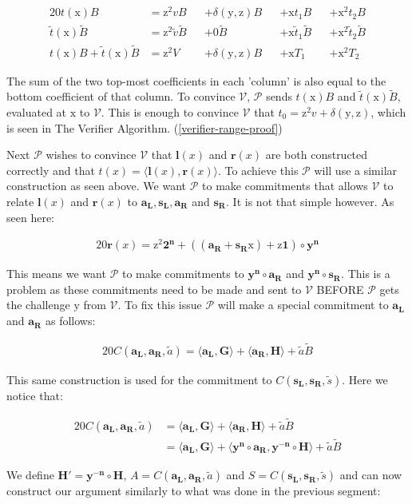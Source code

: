 \documentclass{article}
\newcommand{\eq}[1]{\begin{alignat*}{20}#1\end{alignat*}}
\renewcommand{\vec}[1]{\boldsymbol{#1}}
\newcommand{\ran}[1]{\mathrm{#1}}
\newcommand{\vecran}[1]{\mathbf{#1}}
\newcommand{\V}{\mathcal{V}}
\renewcommand{\P}{\mathcal{P}}
\newcommand{\tB}{\widetilde{B}}
\renewcommand{\tt}{\widetilde{t}}
\newcommand{\tv}{\widetilde{v}}
\newcommand{\dotp}[2]{\langle #1, #2 \rangle}
\newcommand{\opn}[1]{\operatorname{#1}}
\newcommand{\vecl}[1]{\vec{#1_{\opn{L}}}}
\newcommand{\vecr}[1]{\vec{#1_{\opn{R}}}}
\begin{document}
\eq{
	t(\ran{x})B                   &= \ran{z^2}vB      &&+ \delta(\ran{y},\ran{z})B &&+ \ran{x}t_1B       &&+ \ran{x^2}t_2B \\
	\tt(\ran{x})\tB               &= \ran{z^2}\tv \tB &&+ 0\tB                     &&+ \ran{x} \tt_1 \tB &&+ \ran{x^2} \tt_2 \tB\\
	t(\ran{x})B + \tt(\ran{x})\tB &= \ran{z^2}V       &&+ \delta(\ran{y},\ran{z})B &&+ \ran{x}T_1        &&+ \ran{x^2}T_2
}

The sum of the two top-most coefficients in each 'column' is also
equal to the bottom coefficient of that column. To convince $\V$, $\P$
sends $t(\ran{x})B$ and $\tt(\ran{x})\tB$, evaluated at $\ran{x}$
to $\V$. This is enough to convince $\V$ that $t_0 = \ran{z^2}v +
\delta(\ran{y},\ran{z})$, which is seen in The Verifier Algorithm.
(\ref{verifier-range-proof})

Next $\P$ wishes to convince $\V$ that $\vec{l}(x)$ and
$\vec{r}(x)$ are both constructed correctly and that $t(x) =
\dotp{\vec{l}(x)}{\vec{r}(x)}$. To achieve this $\P$ will use a similar
construction as seen above. We want $\P$ to make commitments that allows
$\V$ to relate $\vec{l}(x)$ and $\vec{r}(x)$ to $\vecl{a}, \vecl{s},
\vecr{a}$ and $\vecr{s}$. It is not that simple however. As seen here:

\eq{
	\vec{r}(x) = \ran{z^2}\vec{2^n} + ((\vecr{a} + \vecr{s}\ran{x}) + \ran{z}\vec{1})\circ\vecran{y^n}
}

This means we want $\P$ to make commitments to $\vec{y^n}\circ \vecr{a}$ and $\vec{y^n}\circ\vecr{s}$. This is a problem as these commitments need to be made and sent to $\V$ BEFORE $\P$ gets the challenge $\ran{y}$ from $\V$. To fix this issue $\P$ will make a special commitment to $\vecl{a}$ and $\vecr{a}$ as follows:

\eq{
	C(\vecl{a}, \vecr{a}, \widetilde{a}) = \dotp{\vecl{a}}{\vec{G}} + \dotp{\vecr{a}}{\vec{H}} + \widetilde{a}\tB
}

This same construction is used for the commitment to $C(\vecl{s},
\vecr{s}, \widetilde{s})$. Here we notice that:

\eq{
	C(\vecl{a}, \vecr{a}, \widetilde{a}) &= \dotp{\vecl{a}}{\vec{G}} + \dotp{\vecr{a}}{\vec{H}} + \widetilde{a}\tB \\
	&= \dotp{\vecl{a}}{\vec{G}} + \dotp{\vecran{y^n}\circ \vecr{a}}{\vecran{y^{-n}}\circ \vec{H}} + \widetilde{a}\tB
}

We define $\vec{H'} = \vecran{y^{-n}}\circ\vec{H}$, $A = C(\vecl{a},\vecr{a}, \widetilde{a})$ and $S = C(\vecl{s}, \vecr{s}, \widetilde{s})$ and can now construct our argument similarly to what was done in the previous segment:
\end{document}
